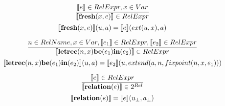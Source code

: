 \documentclass[11pt]{article}
\begin{document}
$$ \frac{\llbracket e\rrbracket \in RelExpr, x \in Var}{\llbracket\textrm{\textbf{fresh}}(x,e)\rrbracket \in RelExpr}$$
$$ \llbracket\textrm{\textbf{fresh}}(x,e)\rrbracket(u, a) = \llbracket e\rrbracket(ext(u,x), a) $$

$$ \frac{ n \in RelName , x \in Var,\llbracket e_1\rrbracket \in RelExpr, \llbracket e_2\rrbracket \in RelExpr}{ \llbracket\textrm{\textbf{letrec}} (n, x) \textrm{\textbf{be}} (e_1) \textrm{\textbf{in}} (e_2)\rrbracket \in RelExpr } $$
$$ \llbracket\textrm{\textbf{letrec}} (n, x) \textrm{\textbf{be}} (e_1) \textrm{\textbf{in}} (e_2)\rrbracket (u, a) = \llbracket e_2\rrbracket(u, extend(a, n, fixpoint(n, x, e_1))) $$

$$ \frac{ \llbracket e\rrbracket \in RelExpr }{ \llbracket\textrm{\textbf{relation}} (e)\rrbracket \in 2^{Rel} } $$
$$ \llbracket\textrm{\textbf{relation}} (e)\rrbracket = \llbracket e\rrbracket(u_\bot, a_\bot) $$

\begin{center}

\end{center}
\end{document}
